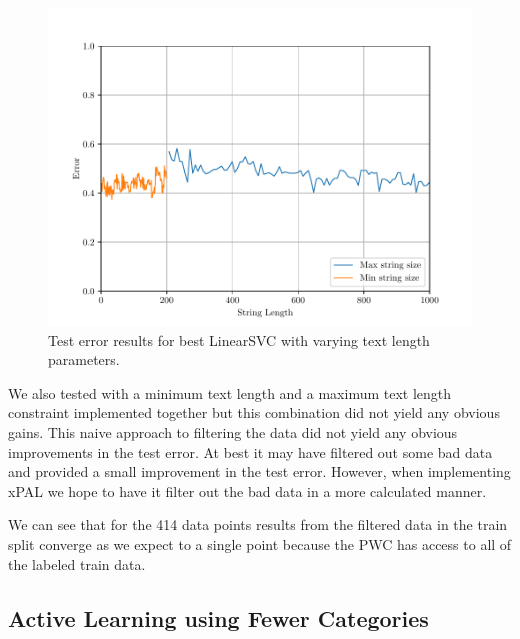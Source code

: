 \begin{figure}[h]
    \centering
    \includegraphics[width=\scale\textwidth]{../img/plot_data_length_grid_search.pdf}
    \caption{Test error results for best LinearSVC with varying text length parameters.}
    \label{fig:grid_search_text_length}
  \end{figure}

We also tested with a minimum text length and a maximum text length constraint implemented together but this combination did not yield any obvious gains. This naive approach to filtering the data did not yield any obvious improvements in the test error. At best it may have filtered out some bad data and provided a small improvement in the test error. However, when implementing xPAL we hope to have it filter out the bad data in a more calculated manner.


We can see that for the 414 data points results from the filtered data in the train split converge as we expect to a single point because the PWC has access to all of the labeled train data. 

\subsection{Active Learning using Fewer Categories}
